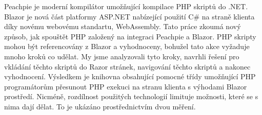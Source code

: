 \documentclass[12pt]{report}
\begin{document}
Peachpie je moderní kompilátor umožňující kompilace PHP skriptů do .NET.
Blazor je nová část platformy ASP.NET nabízející použití C\# na straně klienta díky novému webovému standartu, WebAssembly.
Tato práce zkoumá nový způsob, jak spouštět PHP založený na integraci Peachpie a Blazor.
PHP skripty mohou být referencovány z Blazor a vyhodnoceny, bohužel tato akce vyžaduje mnoho kroků co udělat.
My jsme analyzovali tyto kroky, navrhli řešení pro vkládání těchto skriptů do Razor stránek, navigování těchto skriptů a nakonec vyhodnocení. Výsledkem je knihovna obsahující pomocné třídy umožňující PHP programátorům přesunout PHP exekuci na stranu klienta s výhodami Blazor prostředí.
Nicméně, rozdílnost použitých technologií limituje možnosti, které se s nima dají dělat.
To je ukázáno prostřednictvím dvou měření.   
\end{document}
